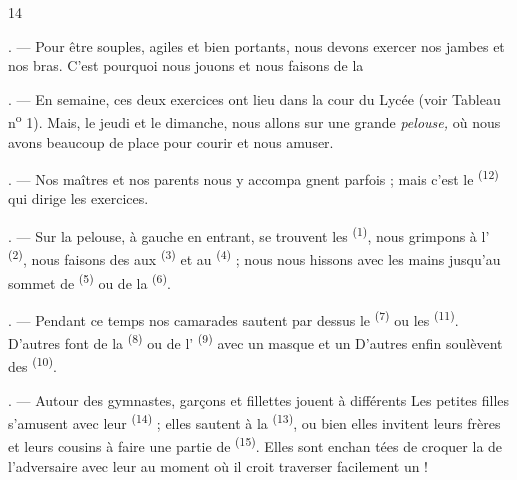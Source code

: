 \begin{VUpage}[16]{14}
\VUsaut{2.4mm}
\VUsaut{3.4mm}

. --- Pour être souples, agiles et bien portants,\nl
nous devons exercer nos jambes et nos bras. C'est\nl
pourquoi nous jouons et nous faisons de la \cc
{}

. --- En semaine, ces deux exercices ont lieu\nl
dans la cour du Lycée (voir Tableau n\textsuperscript{o} 1). Mais, le\nl
jeudi et le dimanche, nous allons sur une grande\nl
\textit{pelouse,} où nous avons beaucoup de place pour courir\nl
et nous amuser.

. --- Nos maîtres et nos parents nous y accompa\cc
gnent parfois ; mais c'est le \cc
{} \textsuperscript{(12)} qui dirige les exercices.

. --- Sur la pelouse, à gauche en entrant, se\nl
trouvent les  \textsuperscript{(1)}, nous\nl
grimpons à l' \textsuperscript{(2)}, nous faisons des \cc
{} aux  \textsuperscript{(3)} et au  \textsuperscript{(4)} ; nous nous\nl
hissons avec les mains jusqu'au sommet de \nl
{} \textsuperscript{(5)} ou de la  \textsuperscript{(6)}.

. --- Pendant ce temps nos camarades sautent\nl
par dessus le  \textsuperscript{(7)} ou les \nl
{} \textsuperscript{(11)}. D'autres font de la  \textsuperscript{(8)} ou de\nl
l' \textsuperscript{(9)} avec un masque et un  D'autres\nl
enfin soulèvent des  \textsuperscript{(10)}.

\VUsaut{5.0mm}
\VUsaut{3.4mm}

. --- Autour des gymnastes, garçons et fillettes\nl
jouent à différents  Les petites filles s'amusent\nl
avec leur  \textsuperscript{(14)} ; elles sautent à la  \textsuperscript{(13)},\nl
ou bien elles invitent leurs frères et leurs cousins\nl
à faire une partie de  \textsuperscript{(15)}. Elles sont enchan\cc
tées de croquer la  de l'adversaire avec leur\nl
{} au moment où il croit traverser facilement\nl
un  !
\end{VUpage}

